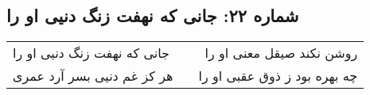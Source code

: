 \begin{center}
\section*{شماره ۲۲: جانی که نهفت زنگ دنیی او را}
\label{sec:022}
\begin{longtable}{l p{0.5cm} r}
جانی که نهفت زنگ دنیی او را
&&
روشن نکند صیقل معنی او را
\\
هر کز غم دنیی بسر آرد عمری
&&
چه بهره بود ز ذوق عقبی او را
\\
\end{longtable}
\end{center}
